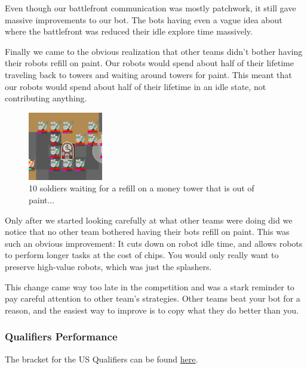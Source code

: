 \medskip

Even though our battlefront communication was mostly patchwork, it still gave massive improvements to our bot. The bots having even a vague idea about where the battlefront was reduced their idle explore time massively.

\medskip

Finally we came to the obvious realization that other teams didn't bother having their robots refill on paint. Our robots would spend about half of their lifetime traveling back to towers and waiting around towers for paint. This meant that our robots would spend about half of their lifetime in an idle state, not contributing anything.

\medskip

\begin{figure}[H]
    \centering
    \includegraphics[scale=1]{images/waiting_for_refill.png}
    \caption{10 soldiers waiting for a refill on a money tower that is out of paint...}
\end{figure}

Only after we started looking carefully at what other teams were doing did we notice that no other team bothered having their bots refill on paint. This was such an obvious improvement: It cuts down on robot idle time, and allows robots to perform longer tasks at the cost of chips. You would only really want to preserve high-value robots, which was just the splashers.

\medskip

This change came way too late in the competition and was a stark reminder to pay careful attention to other team's strategies. Other teams beat your bot for a reason, and the easiest way to improve is to copy what they do better than you.

\subsubsection{Qualifiers Performance}

The bracket for the US Qualifiers can be found \href{https://challonge.com/bc25javausquals}{here}.

\medskip

